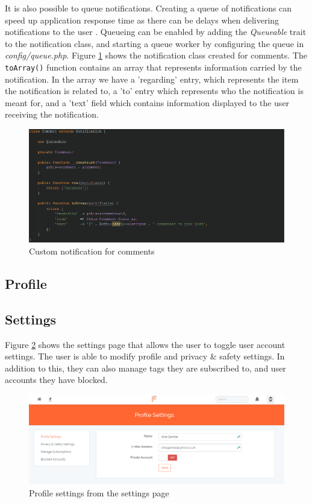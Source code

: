  It is also possible to queue notifications. Creating a queue of notifications can speed up application response time as there can be delays when delivering notifications to the user \cite{Laravel:Notifications, Laravel:Queues}. Queueing can be enabled by adding the \textit{Queueable} trait to the notification class, and starting a queue worker by configuring the queue in \textit{config/queue.php}. Figure \ref{fig:CommentNotification} shows the notification class created for comments. The \texttt{toArray()} function contains an array that represents information carried by the notification. In the array we have a 'regarding' entry, which represents the item the notification is related to, a 'to' entry which represents who the notification is meant for, and a 'text' field which contains information displayed to the user receiving the notification.

\begin{figure}[H]
\centering
\includegraphics[width=\textwidth]{Images/Implementation/CommentNotification}
\caption{Custom notification for comments}
\label{fig:CommentNotification}
\end{figure}

\subsection{Profile}
\subsection{Settings}
Figure \ref{fig:SettingsImplementation} shows the settings page that allows the user to toggle user account settings. The user is able to modify profile and privacy \& safety settings. In addition to this, they can also manage tags they are subscribed to, and user accounts they have blocked.

\begin{figure}[H]
\centering
\includegraphics[width=\textwidth]{Images/Implementation/SettingsPage}
\caption{Profile settings from the settings page}
\label{fig:SettingsImplementation}
\end{figure}

